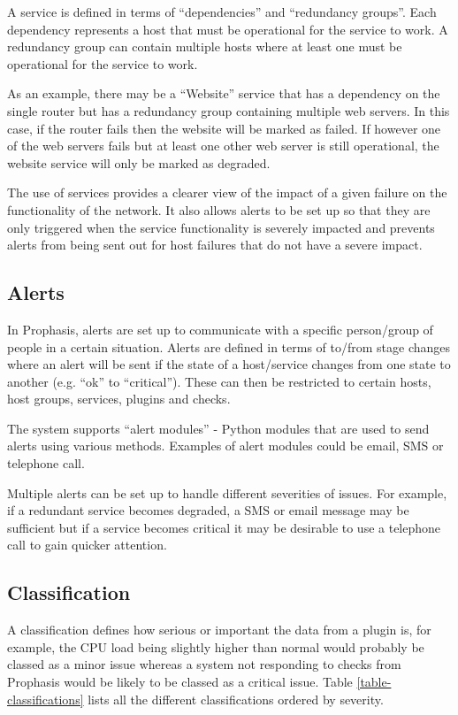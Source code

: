 \documentclass[bsc,deptreport,twoside,parskip,singlespacing,notimes]{infthesis}
\begin{document}
	A service is defined in terms of ``dependencies'' and ``redundancy groups''. Each
	dependency represents a host that must be operational for the service to work.
	A redundancy group can contain multiple hosts where at least one must be
	operational for the service to work.


	As an example, there may be a ``Website'' service that has a dependency on the
	single router but has a redundancy group containing multiple web servers.
	In this case, if the router fails then the website will be marked as failed.
	If however one of the web servers fails but at least one other web server is
	still operational, the website service will only be marked as degraded.


	The use of services provides a clearer view of the impact of a given failure on
	the functionality of the network.  It also allows alerts to be set up so that
	they are only triggered when the service functionality is severely impacted and
	prevents alerts from being sent out for host failures that do not have a severe
	impact.

\subsection{Alerts}

	In Prophasis, alerts are set up to communicate with a specific person/group of
	people in a certain situation.  Alerts are defined in terms of to/from stage
	changes where an alert will be sent if the state of a host/service changes from
	one state to another (e.g. ``ok'' to ``critical'').  These can then be restricted
	to certain hosts, host groups, services, plugins and checks.


	The system supports ``alert modules'' - Python modules that are used to send
	alerts using various methods.  Examples of alert modules could be email, SMS or
	telephone call.


	Multiple alerts can be set up to handle different severities of issues.  For
	example, if a redundant service becomes degraded, a SMS or email message may be
	sufficient but if a service becomes critical it may be desirable to use a
	telephone call to gain quicker attention.

\subsection{Classification}
	A classification defines how serious or important the data from a plugin is,
	for example, the CPU load being slightly higher than normal would probably be
	classed as a minor issue whereas a system not responding to checks from
	Prophasis would be likely to be classed as a critical issue. Table
	\ref{table-classifications} lists all the different classifications ordered
	by severity.
\end{document}
